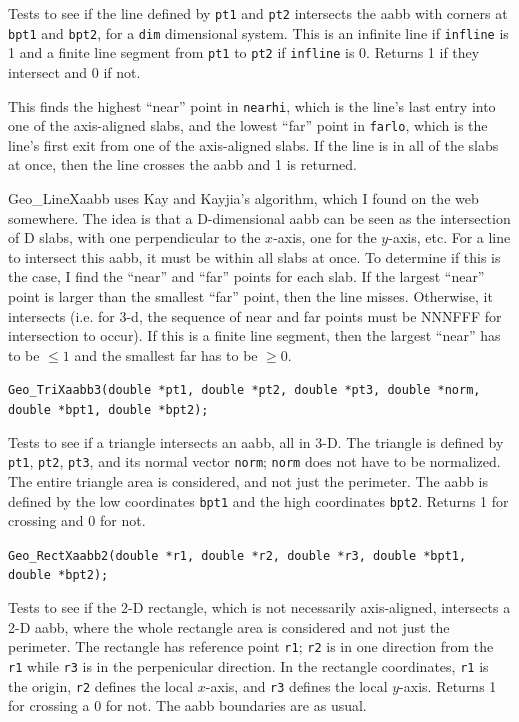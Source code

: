 \documentclass[11pt]{article}
\newcommand {\ttt} {\texttt}
\begin{document}
\begin{description}
Tests to see if the line defined by \ttt{pt1} and \ttt{pt2} intersects the aabb with corners at \ttt{bpt1} and \ttt{bpt2}, for a \ttt{dim} dimensional system. This is an infinite line if \ttt{infline} is 1 and a finite line segment from \ttt{pt1} to \ttt{pt2} if \ttt{infline} is 0. Returns 1 if they intersect and 0 if not.

This finds the highest ``near'' point in \ttt{nearhi}, which is the line's last entry into one of the axis-aligned slabs, and the lowest ``far'' point in \ttt{farlo}, which is the line's first exit from one of the axis-aligned slabs. If the line is in all of the slabs at once, then the line crosses the aabb and 1 is returned.

Geo\_LineXaabb uses Kay and Kayjia's algorithm, which I found on the web somewhere. The idea is that a D-dimensional aabb can be seen as the intersection of D slabs, with one perpendicular to the $x$-axis, one for the $y$-axis, etc. For a line to intersect this aabb, it must be within all slabs at once. To determine if this is the case, I find the ``near'' and ``far'' points for each slab. If the largest ``near'' point is larger than the smallest ``far'' point, then the line misses. Otherwise, it intersects (i.e. for 3-d, the sequence of near and far points must be NNNFFF for intersection to occur). If this is a finite line segment, then the largest ``near'' has to be $\leq 1$ and the smallest far has to be $\geq 0$.

\item[\ttt{int}]
\ttt{Geo\_TriXaabb3(double *pt1, double *pt2, double *pt3, double *norm, double *bpt1, double *bpt2);}

Tests to see if a triangle intersects an aabb, all in 3-D. The triangle is defined by \ttt{pt1}, \ttt{pt2}, \ttt{pt3}, and its normal vector \ttt{norm}; \ttt{norm} does not have to be normalized. The entire triangle area is considered, and not just the perimeter. The aabb is defined by the low coordinates \ttt{bpt1} and the high coordinates \ttt{bpt2}. Returns 1 for crossing and 0 for not.

\item[\ttt{int}]
\ttt{Geo\_RectXaabb2(double *r1, double *r2, double *r3, double *bpt1, double *bpt2);}

Tests to see if the 2-D rectangle, which is not necessarily axis-aligned, intersects a 2-D aabb, where the whole rectangle area is considered and not just the perimeter. The rectangle has reference point \ttt{r1}; \ttt{r2} is in one direction from the \ttt{r1} while \ttt{r3} is in the perpenicular direction. In the rectangle coordinates, \ttt{r1} is the origin, \ttt{r2} defines the local $x$-axis, and \ttt{r3} defines the local $y$-axis. Returns 1 for crossing a 0 for not. The aabb boundaries are as usual.


\end{description}
\end{document}
